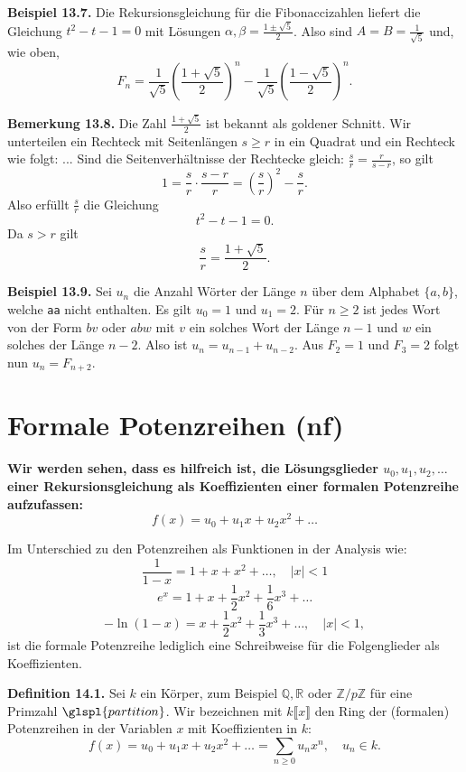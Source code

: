 \documentclass[9pt]{article}
\begin{document}
\textbf{Beispiel 13.7.} Die Rekursionsgleichung für die Fibonaccizahlen liefert die Gleichung $t^2 - t - 1 = 0$ mit Lösungen $\alpha, \beta = \frac{1 \pm \sqrt{5}}{2}$. Also sind $A = B = \frac{1}{\sqrt{5}}$ und, wie oben,
\begin{equation*}
    F_n = \frac{1}{\sqrt{5}}  \left(\frac{1 + \sqrt{5}}{2}\right)^n - \frac{1}{\sqrt{5}} \left(\frac{1 - \sqrt{5}}{2}\right)^n.
\end{equation*}

\textbf{Bemerkung 13.8.} Die Zahl $\frac{1 + \sqrt{5}}{2}$ ist bekannt als goldener Schnitt. 
Wir unterteilen ein Rechteck mit Seitenlängen \( s \geq r \) in ein Quadrat und ein  
Rechteck wie folgt:  
...  
Sind die Seitenverhältnisse der Rechtecke gleich: \( \frac{s}{r} = \frac{r}{s - r} \), so gilt  
\[
1 = \frac{s}{r} \cdot \frac{s - r}{r} = \left( \frac{s}{r} \right)^2 - \frac{s}{r}.
\]
Also erfüllt \( \frac{s}{r} \) die Gleichung  
\[
t^2 - t - 1 = 0.
\]
Da \( s > r \) gilt  
\[
\frac{s}{r} = \frac{1 + \sqrt{5}}{2}.
\]


\textbf{Beispiel 13.9.} Sei $u_n$ die Anzahl Wörter der Länge $n$ über dem Alphabet $\{a, b\}$, welche \texttt{aa} nicht enthalten. Es gilt $u_0 = 1$ und $u_1 = 2$. Für $n \geq 2$ ist jedes Wort von der Form $bv$ oder $abw$ mit $v$ ein solches Wort der Länge $n-1$ und $w$ ein solches der Länge $n-2$. Also ist $u_n = u_{n-1} + u_{n-2}$. Aus $F_2 = 1$ und $F_3 = 2$ folgt nun $u_n = F_{n+2}$.


\section{Formale Potenzreihen (nf)}
\textbf{Wir werden sehen, dass es hilfreich ist, die Lösungsglieder \( u_0, u_1, u_2, \dots \) einer Rekursionsgleichung als Koeffizienten einer formalen Potenzreihe aufzufassen:}
\[
f(x) = u_0 + u_1x + u_2x^2 + \dots
\]

Im Unterschied zu den Potenzreihen als Funktionen in der Analysis wie:
\[
\frac{1}{1 - x} = 1 + x + x^2 + \dots, \quad |x| < 1
\]
\[
e^x = 1 + x + \frac{1}{2} x^2 + \frac{1}{6} x^3 + \dots
\]
\[
-\ln(1 - x) = x + \frac{1}{2} x^2 + \frac{1}{3} x^3 + \dots, \quad |x| < 1,
\]
ist die formale Potenzreihe lediglich eine Schreibweise für die Folgenglieder als Koeffizienten.

\textbf{Definition 14.1.} Sei \( k \) ein Körper, zum Beispiel \( \mathbb{Q}, \mathbb{R} \) oder \( \mathbb{Z}/p\mathbb{Z} \) für eine Primzahl \( \glspl{partition} \).  
Wir bezeichnen mit \( k\llbracket x\rrbracket \) den Ring der (formalen) Potenzreihen in der Variablen \( x \) mit Koeffizienten in \( k \):
\[
f(x) = u_0 + u_1x + u_2x^2 + \dots = \sum_{n \geq 0} u_n x^n, \quad u_n \in k.
\]
\end{document}
